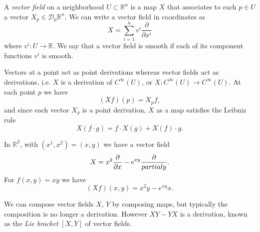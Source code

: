\begin{defn}
A \emph{vector field} on a neighborhood $U \subset \mathbb{R}^n$ is a
map $X$ that associates to each $p \in U$ a vector
$X_p \in \mathcal{D}_p \mathbb{R}^n$. We can write a vector field in
coordinates as
$$
X = \sum_{i=1}^n v^i \frac{\partial}{\partial x^i}
$$
where $v^i : U \to \mathbb{R}$. We say that a vector field is smooth
if each of its component functions $v^i$ is smooth.
\end{defn}

Vectors at a point act as point derivations whereas vector fields act
as derivations, i.e. $X$ is a derivation of $C^\infty(U)$,
or $X: C^\infty(U) \to C^\infty(U)$. At each point $p$ we have
$$
(X f)(p) = X_p f,
$$
and since each vector $X_p$ is a point derivation, $X$ as a map
satisfies the Leibniz rule
$$
X (f \cdot g) = f \cdot X(g) + X(f) \cdot g.
$$

\begin{xmpl}
In $\mathbb{R}^2$, with $(x^1, x^2) = (x, y)$ we have a vector field
$$
X = x^2 \frac{\partial}{\partial x} - e^{xy} \frac{\partial}{\\partial y}.
$$
For $f(x, y) = xy$ we have
$$
(Xf)(x, y) = x^2 y - e^{xy} x.
$$
\end{xmpl}

We can compose vector fields $X$, $Y$ by composing maps, but typically
the composition is no longer a derivation. However $XY - YX$ is a
derivation, known as the \emph{Lie bracket} $[X, Y]$ of vector fields.

